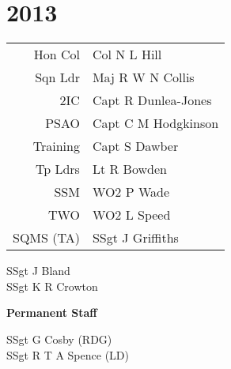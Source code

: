 \chapter*{2013}

\vspace*{20mm}

\begin{center}
  \begin{tabular}{rl}
    Hon Col & Col N L Hill \\
    Sqn Ldr & Maj R W N Collis \\
    2IC & Capt R Dunlea-Jones \\
    PSAO & Capt C M Hodgkinson \\
    Training & Capt S Dawber \\
    Tp Ldrs & Lt R Bowden \\
    SSM & WO2 P Wade \\
    TWO & WO2 L Speed \\
    SQMS (TA) & SSgt J Griffiths \\
  \end{tabular}
\end{center}

\vspace*{5mm}

\begin{center}
  \noindent
  SSgt J Bland \\
  SSgt K R Crowton \\
\end{center}

\vspace*{10mm}

\begin{center}
  \Large
  \textbf{Permanent Staff}
\end{center}

\begin{center}
  \noindent
  SSgt G Cosby (RDG) \\
  SSgt R T A Spence (LD) \\
\end{center}
